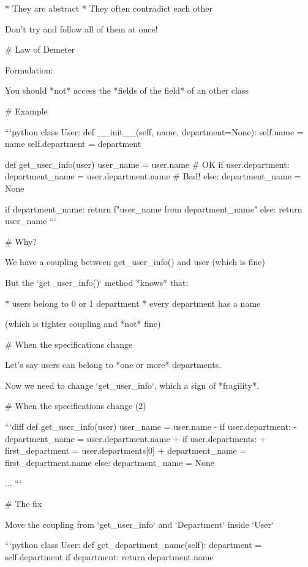 * They are abstract
* They often contradict each other

\vfill

Don't try and follow all of them at once!


# Law of Demeter

Formulation:

You should *not* access the *fields of the field* of an other class

# Example

```python
class User:
    def __init__(self, name, department=None):
        self.name = name
        self.department = department

def get_user_info(user)
    user_name = user.name  # OK
    if user.department:
        department_name = user.department.name  # Bad!
    else:
        department_name = None

    if department_name:
        return f"{user_name} from {department_name}"
    else:
        return user_name
```

# Why?

We have a coupling between get_user_info() and user (which is fine)

\vfill

But the `get_user_info()` method *knows* that:

* users belong to 0 or 1 department
* every department has a name

(which is tighter coupling and *not* fine)


# When the specifications change

Let's say users can belong to *one or more* departments.

Now we need to change `get_user_info`, which a sign of *fragility*.

# When the specifications change (2)

```diff
def get_user_info(user)
    user_name = user.name
-    if user.department:
-       department_name = user.department.name
+    if user.departments:
+       first_department = user.departments[0]
+       department_name = first_department.name
    else:
        department_name = None

    ...
```


# The fix

Move the coupling from `get_user_info` and `Department` inside `User`

```python
class User:
    def get_department_name(self):
        department = self.department
        if department:
            return department.name


